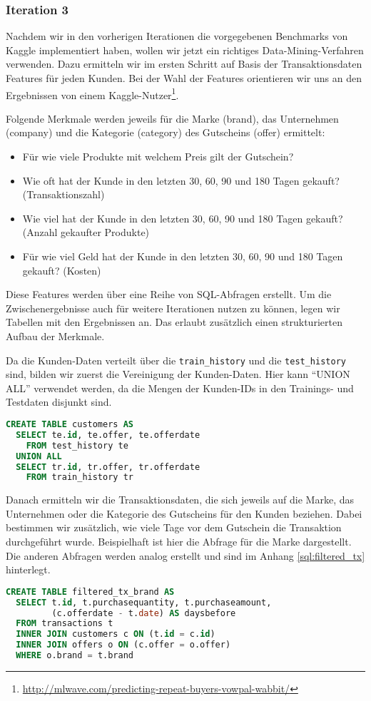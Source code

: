\subsubsection{Iteration 3}

Nachdem wir in den vorherigen Iterationen die vorgegebenen Benchmarks von Kaggle implementiert haben,
wollen wir jetzt ein richtiges Data-Mining-Verfahren verwenden. Dazu ermitteln wir im ersten Schritt
auf Basis der Transaktionsdaten Features für jeden Kunden. Bei der Wahl der Features orientieren
wir uns an den Ergebnissen von einem 
Kaggle-Nutzer\footnote{\url{http://mlwave.com/predicting-repeat-buyers-vowpal-wabbit/}}.

Folgende Merkmale werden jeweils für die Marke (brand), das Unternehmen (company) und die Kategorie (category)
des Gutscheins (offer) ermittelt:
\begin{itemize}
	\item Für wie viele Produkte mit welchem Preis gilt der Gutschein?
	\item Wie oft hat der Kunde in den letzten 30, 60, 90 und 180 Tagen gekauft? (Transaktionszahl)
	\item Wie viel hat der Kunde in den letzten 30, 60, 90 und 180 Tagen gekauft? (Anzahl gekaufter Produkte)
	\item Für wie viel Geld hat der Kunde in den letzten 30, 60, 90 und 180 Tagen gekauft? (Kosten)
\end{itemize}

Diese Features werden über eine Reihe von SQL-Abfragen erstellt. Um die Zwischenergebnisse auch für
weitere Iterationen nutzen zu können, legen wir Tabellen mit den Ergebnissen an. Das erlaubt zusätzlich
einen strukturierten Aufbau der Merkmale.

Da die Kunden-Daten verteilt über die \texttt{train\_history} und die \texttt{test\_history} sind, 
bilden wir zuerst die Vereinigung der Kunden-Daten. Hier kann "`UNION ALL"' verwendet werden, da die 
Mengen der Kunden-IDs in den Trainings- und Testdaten disjunkt sind.

\begin{lstlisting}[language=SQL]
CREATE TABLE customers AS 
  SELECT te.id, te.offer, te.offerdate
    FROM test_history te
  UNION ALL
  SELECT tr.id, tr.offer, tr.offerdate
    FROM train_history tr 
\end{lstlisting}

Danach ermitteln wir die Transaktionsdaten, die sich jeweils auf die Marke, das Unternehmen oder 
die Kategorie des Gutscheins für den Kunden beziehen. Dabei bestimmen wir zusätzlich, wie viele
Tage vor dem Gutschein die Transaktion durchgeführt wurde. Beispielhaft ist hier die Abfrage
für die Marke dargestellt. Die anderen Abfragen werden analog erstellt und sind im Anhang
\ref{sql:filtered_tx} hinterlegt.
\begin{lstlisting}[language=SQL]
CREATE TABLE filtered_tx_brand AS
  SELECT t.id, t.purchasequantity, t.purchaseamount, 
         (c.offerdate - t.date) AS daysbefore 
  FROM transactions t 
  INNER JOIN customers c ON (t.id = c.id)
  INNER JOIN offers o ON (c.offer = o.offer)
  WHERE o.brand = t.brand
\end{lstlisting}


